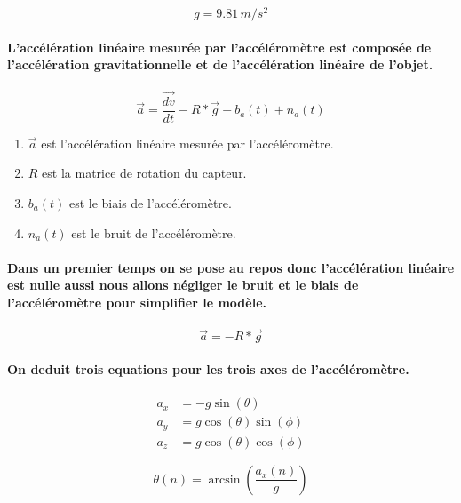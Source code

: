 \begin{equation}
	g = 9.81 \, m/s^2
\end{equation}

\paragraph{L'accélération linéaire mesurée par l'accéléromètre est composée de l'accélération gravitationnelle et de l'accélération linéaire de l'objet.}

\begin{equation}
	\vec{a} = \frac{\vec{dv}}{dt} - R * \vec{g} + b_a(t) + n_a(t)
\end{equation}

\begin{enumerate}
	\item $\vec{a}$ est l'accélération linéaire mesurée par l'accéléromètre.
	\item $R$ est la matrice de rotation du capteur.
	\item $b_a(t)$ est le biais de l'accéléromètre.
	\item $n_a(t)$ est le bruit de l'accéléromètre.
\end{enumerate}

\paragraph{Dans un premier temps on se pose au repos donc l'accélération linéaire est nulle aussi nous allons négliger le bruit et le biais de l'accéléromètre pour simplifier le modèle.}

\begin{equation*}
	\vec{a} = -R * \vec{g}
\end{equation*}

\paragraph{On deduit trois equations pour les trois axes de l'accéléromètre.}

\begin{align*}
	a_x &= -g \sin(\theta) \\
	a_y &= g \cos(\theta) \sin(\phi) \\
	a_z &= g \cos(\theta) \cos(\phi)
\end{align*}

\begin{equation}
	\theta(n) = \arcsin\left(\frac{a_x(n)}{g}\right)
\end{equation}

